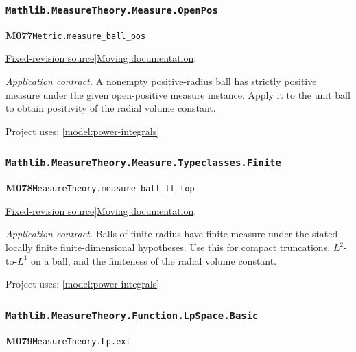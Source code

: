 \documentclass[11pt,a4paper]{article}
\theoremstyle{definition}
\theoremstyle{remark}
\begin{document}
\subsubsection*{\nolinkurl{Mathlib.MeasureTheory.Measure.OpenPos}}
\noindent\textbf{M077}\label{base:M077}\quad\nolinkurl{Metric.measure_ball_pos}

\href{https://github.com/leanprover-community/mathlib4/blob/9bac2d0692944a775113f7c130fd5e5b4608a854/Mathlib/MeasureTheory/Measure/OpenPos.lean}{Fixed-revision source}\quad|\quad\href{https://leanprover-community.github.io/mathlib4_docs/Mathlib/MeasureTheory/Measure/OpenPos.html#Metric.measure_ball_pos}{Moving documentation}.\par
\noindent\textit{Application contract.} A nonempty positive-radius ball has strictly positive measure under the given open-positive measure instance. Apply it to the unit ball to obtain positivity of the radial volume constant.\par
{\small Project uses: \ref{model:power-integrals}}\par\medskip

\subsubsection*{\nolinkurl{Mathlib.MeasureTheory.Measure.Typeclasses.Finite}}
\noindent\textbf{M078}\label{base:M078}\quad\nolinkurl{MeasureTheory.measure_ball_lt_top}

\href{https://github.com/leanprover-community/mathlib4/blob/9bac2d0692944a775113f7c130fd5e5b4608a854/Mathlib/MeasureTheory/Measure/Typeclasses/Finite.lean}{Fixed-revision source}\quad|\quad\href{https://leanprover-community.github.io/mathlib4_docs/Mathlib/MeasureTheory/Measure/Typeclasses/Finite.html#MeasureTheory.measure_ball_lt_top}{Moving documentation}.\par
\noindent\textit{Application contract.} Balls of finite radius have finite measure under the stated locally finite finite-dimensional hypotheses. Use this for compact truncations, $L^2$-to-$L^1$ on a ball, and the finiteness of the radial volume constant.\par
{\small Project uses: \ref{model:power-integrals}}\par\medskip

\subsubsection*{\nolinkurl{Mathlib.MeasureTheory.Function.LpSpace.Basic}}
\noindent\textbf{M079}\label{base:M079}\quad\nolinkurl{MeasureTheory.Lp.ext}
\end{document}
